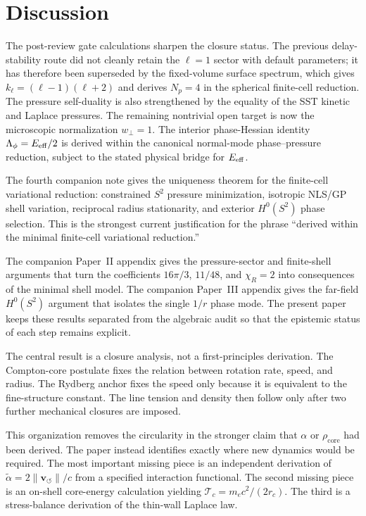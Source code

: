 \documentclass[aps,pra,preprint,longbibliography,nofootinbib]{revtex4-2}
\newcommand{\vnorm}{\lVert\mathbf{v}_{\!\boldsymbol{\circlearrowleft}}\rVert} %
\begin{document}
\section{Discussion}

The post-review gate calculations sharpen the closure status.  The previous
delay-stability route did not cleanly retain the \(\ell=1\) sector with default
parameters; it has therefore been superseded by the fixed-volume surface
spectrum, which gives \(k_\ell=(\ell-1)(\ell+2)\) and derives
\(N_p=4\) in the spherical finite-cell reduction.  The pressure self-duality is
also strengthened by the equality of the SST kinetic and Laplace pressures.
The remaining nontrivial open target is now the microscopic normalization
\(w_\perp=1\).  The interior phase-Hessian identity
\(\Lambda_\phi=E_{\rm eff}/2\) is derived within the canonical normal-mode
phase--pressure reduction, subject to the stated physical bridge for
\(E_{\rm eff}\).


The fourth companion note gives the uniqueness theorem for the finite-cell
variational reduction: constrained \(S^2\) pressure minimization, isotropic
NLS/GP shell variation, reciprocal radius stationarity, and exterior
\(H^0(S^2)\) phase selection.  This is the strongest current justification for
the phrase ``derived within the minimal finite-cell variational reduction.''


The companion Paper~II appendix gives the pressure-sector and finite-shell
arguments that turn the coefficients \(16\pi/3\), \(11/48\), and
\(\chi_R=2\) into consequences of the minimal shell model.  The companion
Paper~III appendix gives the far-field \(H^0(S^2)\) argument that isolates the
single \(1/r\) phase mode.  The present paper keeps these results separated from
the algebraic audit so that the epistemic status of each step remains explicit.

\label{sec:discussion}

The central result is a closure analysis, not a first-principles
derivation.  The Compton-core postulate fixes the relation between
rotation rate, speed, and radius.  The Rydberg anchor fixes the speed
only because it is equivalent to the fine-structure constant.  The line
tension and density then follow only after two further mechanical
closures are imposed.

This organization removes the circularity in the stronger claim that
$\alpha$ or $\rho_{\mathrm{core}}$ had been derived.  The paper instead
identifies exactly where new dynamics would be required.  The most
important missing piece is an independent derivation of
$\tilde\alpha=2\vnorm/c$ from a specified interaction functional.  The
second missing piece is an on-shell core-energy calculation yielding
$\mathcal{T}_c=m_ec^2/(2r_c)$.  The third is a stress-balance derivation
of the thin-wall Laplace law.
\end{document}
